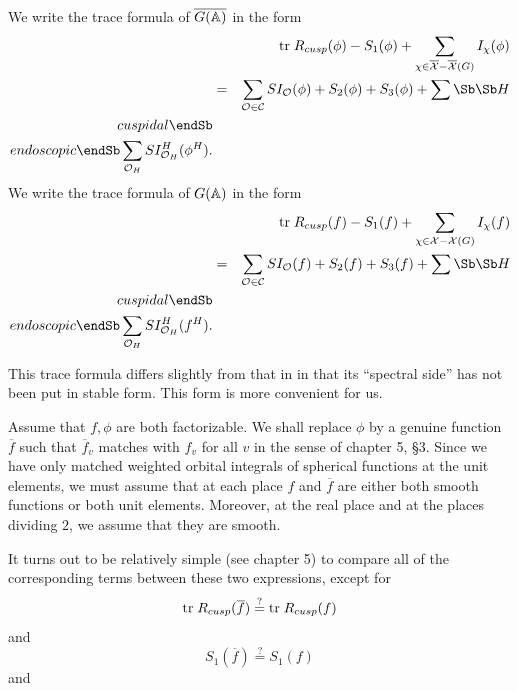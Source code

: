 We write the trace formula of $\overline{G({\Bbb A})}$ in
the form
\begin{eqnarray}
&&{\rm tr}\;R_{cusp}(\phi )-S_1(\phi )+
\sum_{\chi \in \overline{{\cal X}}-\overline{{\cal X}}(G)}
I_\chi (\phi ) \\
&=&\sum_{{\cal O}\in {\cal C}}SI_{{\cal O}}(\phi )
+S_2(\phi )+S_3(\phi )+
\sum\Sb \Sb H \\ cuspidal \endSb  \\ endoscopic \endSb
\sum_{{\cal O}_H}SI_{{\cal O}_H}^H(\phi ^H).  \nonumber
\end{eqnarray}
We write the trace formula of $G({\Bbb A})$ in the form
\begin{eqnarray}
&&\ {\rm tr}\;R_{cusp}(f)-S_1(f)+
\sum_{\chi \in {\cal X}-{\cal X}(G)}I_\chi(f) \\
\  &=&\sum_{{\cal O}\in {\cal C}}SI_{{\cal O}}(f)
+S_2(f)+S_3(f)+\sum\Sb \Sb H
\\ cuspidal \endSb  \\ endoscopic \endSb
\sum_{{\cal O}_H}SI_{{\cal O}_H}^H(f^H).  \nonumber
\end{eqnarray}

This trace formula differs slightly from that in \cite{LL}
in that its ``spectral
side'' has not been put in stable form. This form is more
convenient for us.

Assume that $f,\phi $ are both factorizable. We shall replace $\phi $ by a
genuine function $\overline{f}$ such that
$\overline{f}_v$ matches with $f_v$ for all $v$ in the sense of
chapter 5, \S 3. Since we have only matched weighted orbital integrals
of spherical functions at the unit elements, we must assume that
at each place $f$ and $\overline{f}$ are either both
smooth functions or both unit elements. Moreover, at the real place
and at the places dividing $2$, we assume that they are smooth.

It turns out to be relatively simple (see chapter 5)
to compare all of the
corresponding terms between these two expressions, except for
\begin{equation}
{\rm tr}\;R_{cusp}(\overline{f})\stackrel{?}{=}{\rm tr}\;R_{cusp}(f)
\end{equation}
and
\begin{equation}
S_1(\overline{f})\stackrel{?}{=}S_1(f)
\end{equation}
and 

